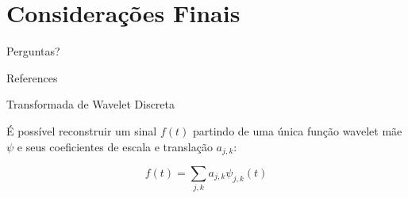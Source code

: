 \documentclass[10pt]{beamer}
\begin{document}
\section{Considerações Finais}

 {
 \begin{frame}[standout]
   Perguntas?
 \end{frame}
}

\appendix


\begin{frame}[allowframebreaks]{References}

  
  

\end{frame}

\begin{frame}
\end{frame}

\begin{frame}{Transformada de Wavelet Discreta}

  É possível reconstruir um sinal $f(t)$ partindo de uma 
  única função wavelet mãe $\psi$ e seus coeficientes de escala e translação $a_{j, k}$:

  \begin{equation}
    f(t) = \sum_{j, k} a_{j, k} \psi_{j, k} (t)
    \nonumber
  \end{equation}
  
\end{frame}
\end{document}
